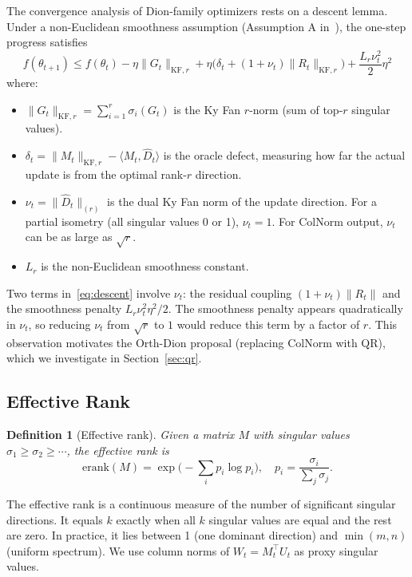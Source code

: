 \documentclass[11pt]{article}
\newcommand{\norm}[1]{\|#1\|}
\newcommand{\inner}[2]{\langle #1, #2 \rangle}
\newtheorem{definition}{Definition}
\begin{document}
The convergence analysis of Dion-family optimizers rests on a descent lemma. Under a non-Euclidean smoothness assumption (Assumption A in~\cite{ahn2025dion}), the one-step progress satisfies
\begin{equation}
f(\theta_{t+1}) \leq f(\theta_t) - \eta \norm{G_t}_{\mathrm{KF},r} + \eta\big(\delta_t + (1 + \nu_t)\norm{R_t}_{\mathrm{KF},r}\big) + \frac{L_r \nu_t^2}{2}\eta^2
\label{eq:descent}
\end{equation}
where:
\begin{itemize}[nosep]
    \item $\norm{G_t}_{\mathrm{KF},r} = \sum_{i=1}^r \sigma_i(G_t)$ is the Ky Fan $r$-norm (sum of top-$r$ singular values).
    \item $\delta_t = \norm{M_t}_{\mathrm{KF},r} - \inner{M_t}{\hat{D}_t}$ is the oracle defect, measuring how far the actual update is from the optimal rank-$r$ direction.
    \item $\nu_t = \norm{\hat{D}_t}_{(r)}$ is the dual Ky Fan norm of the update direction. For a partial isometry (all singular values 0 or 1), $\nu_t = 1$. For ColNorm output, $\nu_t$ can be as large as $\sqrt{r}$.
    \item $L_r$ is the non-Euclidean smoothness constant.
\end{itemize}

Two terms in~\eqref{eq:descent} involve $\nu_t$: the residual coupling $(1+\nu_t)\norm{R_t}$ and the smoothness penalty $L_r \nu_t^2 \eta^2 / 2$. The smoothness penalty appears quadratically in $\nu_t$, so reducing $\nu_t$ from $\sqrt{r}$ to $1$ would reduce this term by a factor of $r$. This observation motivates the Orth-Dion proposal (replacing ColNorm with QR), which we investigate in Section~\ref{sec:qr}.

\subsection{Effective Rank}

\begin{definition}[Effective rank]
Given a matrix $M$ with singular values $\sigma_1 \geq \sigma_2 \geq \cdots$, the effective rank is
\[
\mathrm{erank}(M) = \exp\Big(-\sum_i p_i \log p_i\Big), \quad p_i = \frac{\sigma_i}{\sum_j \sigma_j}.
\]
\end{definition}
The effective rank is a continuous measure of the number of significant singular directions. It equals $k$ exactly when all $k$ singular values are equal and the rest are zero. In practice, it lies between 1 (one dominant direction) and $\min(m,n)$ (uniform spectrum). We use column norms of $W_t = M_t^\top U_t$ as proxy singular values.
\end{document}

